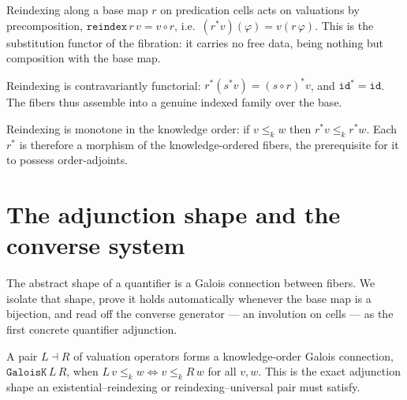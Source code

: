 \begin{definition}[Reindexing]\label{def:reindex}\leanok{}
Reindexing along a base map $r$ on predication cells acts on valuations by
precomposition, $\texttt{reindex}\,r\,v = v \circ r$, i.e.\ $(r^{*}v)(\varphi) =
v(r\,\varphi)$. This is the substitution functor of the fibration: it carries no
free data, being nothing but composition with the base map.
\end{definition}

\begin{theorem}\label{thm:reindex-comp}\leanok{}
Reindexing is contravariantly functorial: $r^{*}(s^{*}v) = (s\circ r)^{*}v$, and
$\texttt{id}^{*} = \texttt{id}$. The fibers thus assemble into a genuine
indexed family over the base.
\end{theorem}

\begin{theorem}[Monotonicity]\label{thm:reindex-mono}\leanok{}
Reindexing is monotone in the knowledge order: if $v \le_k w$ then $r^{*}v \le_k
r^{*}w$. Each $r^{*}$ is therefore a morphism of the knowledge-ordered fibers,
the prerequisite for it to possess order-adjoints.
\end{theorem}

\section{The adjunction shape and the converse system}

The abstract shape of a quantifier is a Galois connection between fibers. We
isolate that shape, prove it holds automatically whenever the base map is a
bijection, and read off the converse generator --- an involution on cells --- as
the first concrete quantifier adjunction.

\begin{definition}\label{def:galoisK}\leanok{}
A pair $L \dashv R$ of valuation operators forms a knowledge-order Galois
connection, $\texttt{GaloisK}\,L\,R$, when $L\,v \le_k w \iff v \le_k R\,w$ for
all $v, w$. This is the exact adjunction shape an existential--reindexing or
reindexing--universal pair must satisfy.
\end{definition}

